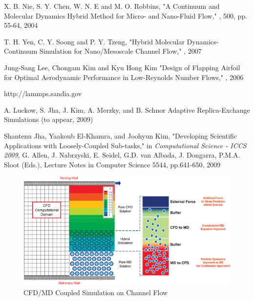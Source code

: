 \documentclass[a4paper]{article}
\begin{document}
\begin{thebibliography}{99}
X. B. Nie, S. Y. Chen, W. N. E and M. O. Robbins,
\newblock "A Continuum and Molecular Dynamics Hybrid Method for Micro- and Nano-Fluid Flow,"
, 500, pp. 55-64, 2004

T. H. Yen, C. Y. Soong and P. Y. Tzeng,
\newblock "Hybrid Molecular Dynamics-Continuum Simulation for Nano/Mesoscale Channel Flow,"
, 2007

Jung-Sang Lee, Chongam Kim and Kyu Hong Kim
\newblock "Design of Flapping Airfoil for Optimal Aerodynamic Performance in Low-Reynolds Number Flows,"
, 2006

http://lammps.sandia.gov

A. Luckow, S. Jha, J. Kim, A. Merzky, and B. Schnor
\newblock Adaptive Replica-Exchange Simulations
 (to appear, 2009)


Shantenu Jha, Yaakoub El-Khamra, and Joohyun Kim,
\newblock "Developing Scientific Applications with Loosely-Coupled Sub-tasks,"
\newblock in {\em Computational Science - ICCS 2009}, G. Allen, J. Nabrzyski, E. Seidel, G.D. van Albada, J. Dongarra, P.M.A. Sloot (Eds.), Lecture Notes in Computer Science 5544, pp.641-650, 2009

\end{thebibliography}

\vspace{2pt}


\begin{figure}
\centering
\includegraphics[scale=0.45]{Image1.eps}
\caption{CFD/MD Coupled Simulation on Channel Flow}
\end{figure}
\end{document}
